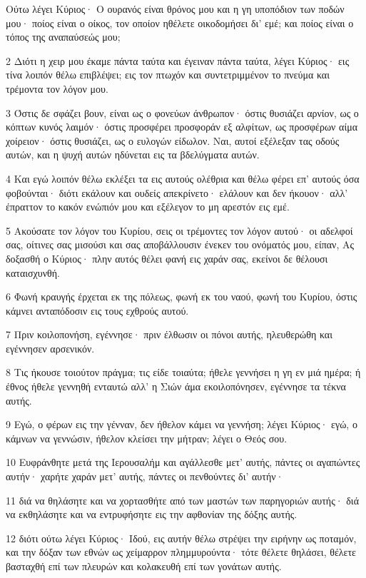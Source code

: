 \par Ούτω λέγει Κύριος· Ο ουρανός είναι θρόνος μου και η γη υποπόδιον των ποδών μου· ποίος είναι ο οίκος, τον οποίον ηθέλετε οικοδομήσει δι' εμέ; και ποίος είναι ο τόπος της αναπαύσεώς μου;
\par 2 Διότι η χειρ μου έκαμε πάντα ταύτα και έγειναν πάντα ταύτα, λέγει Κύριος· εις τίνα λοιπόν θέλω επιβλέψει; εις τον πτωχόν και συντετριμμένον το πνεύμα και τρέμοντα τον λόγον μου.
\par 3 Όστις δε σφάζει βουν, είναι ως ο φονεύων άνθρωπον· όστις θυσιάζει αρνίον, ως ο κόπτων κυνός λαιμόν· όστις προσφέρει προσφοράν εξ αλφίτων, ως προσφέρων αίμα χοίρειον· όστις θυσιάζει, ως ο ευλογών είδωλον. Ναι, αυτοί εξέλεξαν τας οδούς αυτών, και η ψυχή αυτών ηδύνεται εις τα βδελύγματα αυτών.
\par 4 Και εγώ λοιπόν θέλω εκλέξει τα εις αυτούς ολέθρια και θέλω φέρει επ' αυτούς όσα φοβούνται· διότι εκάλουν και ουδείς απεκρίνετο· ελάλουν και δεν ήκουον· αλλ' έπραττον το κακόν ενώπιόν μου και εξέλεγον το μη αρεστόν εις εμέ.
\par 5 Ακούσατε τον λόγον του Κυρίου, σεις οι τρέμοντες τον λόγον αυτού· οι αδελφοί σας, οίτινες σας μισούσι και σας αποβάλλουσιν ένεκεν του ονόματός μου, είπαν, Ας δοξασθή ο Κύριος· πλην αυτός θέλει φανή εις χαράν σας, εκείνοι δε θέλουσι καταισχυνθή.
\par 6 Φωνή κραυγής έρχεται εκ της πόλεως, φωνή εκ του ναού, φωνή του Κυρίου, όστις κάμνει ανταπόδοσιν εις τους εχθρούς αυτού.
\par 7 Πριν κοιλοπονήση, εγέννησε· πριν έλθωσιν οι πόνοι αυτής, ηλευθερώθη και εγέννησεν αρσενικόν.
\par 8 Τις ήκουσε τοιούτον πράγμα; τις είδε τοιαύτα; ήθελε γεννήσει η γη εν μιά ημέρα; ή έθνος ήθελε γεννηθή ενταυτώ αλλ' η Σιών άμα εκοιλοπόνησεν, εγέννησε τα τέκνα αυτής.
\par 9 Εγώ, ο φέρων εις την γένναν, δεν ήθελον κάμει να γεννήση; λέγει Κύριος· εγώ, ο κάμνων να γεννώσιν, ήθελον κλείσει την μήτραν; λέγει ο Θεός σου.
\par 10 Ευφράνθητε μετά της Ιερουσαλήμ και αγάλλεσθε μετ' αυτής, πάντες οι αγαπώντες αυτήν· χαρήτε χαράν μετ' αυτής, πάντες οι πενθούντες δι' αυτήν·
\par 11 διά να θηλάσητε και να χορτασθήτε από των μαστών των παρηγοριών αυτής· διά να εκθηλάσητε και να εντρυφήσητε εις την αφθονίαν της δόξης αυτής.
\par 12 διότι ούτω λέγει Κύριος· Ιδού, εις αυτήν θέλω στρέψει την ειρήνην ως ποταμόν, και την δόξαν των εθνών ως χείμαρρον πλημμυρούντα· τότε θέλετε θηλάσει, θέλετε βασταχθή επί των πλευρών και κολακευθή επί των γονάτων αυτής.
